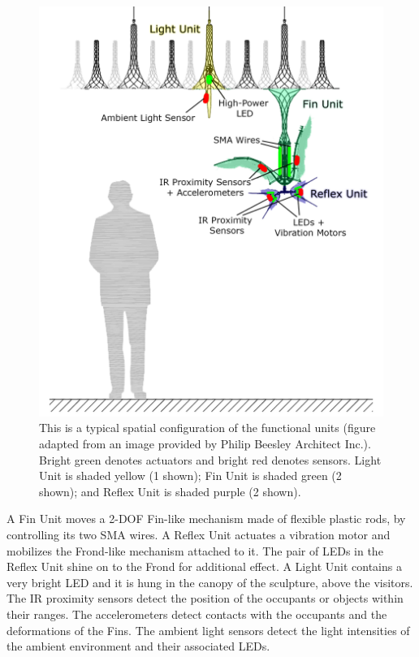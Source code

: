 \begin{figure}[!htb]
	\centering
	\includegraphics[height=0.85 \textheight]{"fig/interactive control system/Physical hardware"}
	\caption[Typical spatial configuration of the physical functional units]{This is a typical spatial configuration of the functional units (figure adapted from an image provided by Philip Beesley Architect Inc.). Bright green denotes actuators and bright red denotes sensors. Light Unit is shaded yellow (1 shown); Fin Unit is shaded green (2 shown); and Reflex Unit is shaded purple (2 shown).}
	\label{fig:Physical hardware}
\end{figure}

A Fin Unit moves a 2-DOF Fin-like mechanism made of flexible plastic rods, by controlling its two SMA wires. A Reflex Unit actuates a vibration motor and mobilizes the Frond-like mechanism attached to it. The pair of LEDs in the Reflex Unit shine on to the Frond for additional effect. A Light Unit contains a very bright LED and it is hung in the canopy of the sculpture, above the visitors. The IR proximity sensors detect the position of the occupants or objects within their ranges. The accelerometers detect contacts with the occupants and the deformations of the Fins. The ambient light sensors detect the light intensities of the ambient environment and their associated LEDs. 


